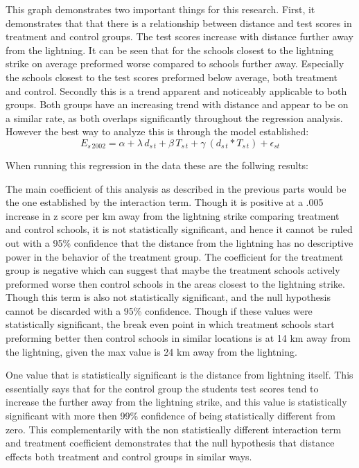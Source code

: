 \documentclass{article}
\begin{document}
This graph demonstrates two important things for this research. First, it demonstrates that that there is a relationship between distance and test scores in treatment and control groups. The test scores increase with distance further away from the lightning. It can be seen that for the schools closest to the lightning strike on average preformed worse compared to schools further away. Especially the schools closest to the test scores preformed below average, both treatment and control. Secondly this is a trend apparent and noticeably applicable to both groups. Both groups have an increasing trend with distance and appear to be on a similar rate, as both overlaps significantly throughout the regression analysis. However the best way to analyze this is through the model established:\[ E_{s\,2002} = \alpha + \lambda\,d_{s\,t} + \beta\,T_{s\,t} +  \gamma\ (d_{s\,t}* T_{s\,t})+ \epsilon_{s t}\]

When running this regression in the data these are the follwing results:

\begin{table}[H] %
  \label{tab:summary}
\end{table}

The main coefficient of this analysis as described in the previous parts would be the one established by the interaction term. Though it is positive at a .005 increase in z score per km away from the lightning strike comparing treatment and control schools, it is not statistically significant, and hence it cannot be ruled out with a 95\% confidence that the distance from the lightning has no descriptive power in the behavior of the treatment group. The coefficient for the treatment group is negative which can suggest that maybe the treatment schools actively preformed worse then control schools in the areas closest to the lightning strike. Though this term is also not statistically significant, and the null hypothesis cannot be discarded with a 95\% confidence. Though if these values were statistically significant, the break even point in which treatment schools start preforming better then control schools in similar locations is at 14 km away from the lightning, given the max value is 24 km away from the lightning. 

One value that is statistically significant is the distance from lightning itself. This essentially says that for the control group the students test scores tend to increase the further away from the lightning strike, and this value is statistically significant with more then 99\% confidence of being statistically different from zero. This complementarily with the non statistically different interaction term and treatment coefficient demonstrates that the null hypothesis that distance effects both treatment and control groups in similar ways. 
\end{document}
